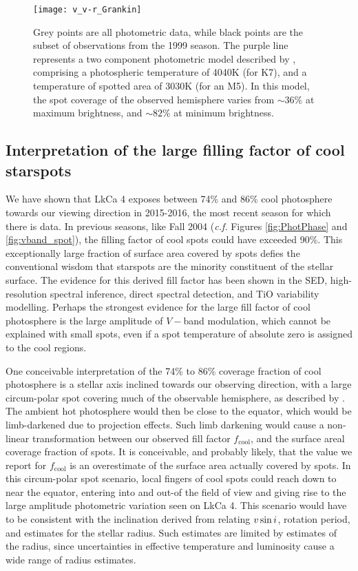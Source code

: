 \documentclass[twocolumn]{emulateapj}%
\begin{document}
\begin{figure}
 \centering
\texttt{[image: v\_v-r\_Grankin]} 
\caption{Grey points are all \citet{grankin08} photometric data, while black points are the subset of observations from the 1999 season.  The purple line represents a two component photometric model  described by \citet{grankin08}, comprising a photospheric temperature of 4040K (for K7), and a temperature of spotted area of 3030K (for an M5). In this model, the spot coverage of the observed hemisphere varies from $\sim36\%$ at maximum brightness, and $\sim82\%$ at minimum brightness.}
 \label{fig:grankin_vr}
\end{figure}




\subsection{Interpretation of the large filling factor of cool starspots}
We have shown that LkCa 4 exposes between 74\% and 86\% cool photosphere towards our viewing direction in 2015-2016, the most recent season for which there is data.  In previous seasons, like Fall 2004 (\emph{c.f.} Figures \ref{fig:PhotPhase} and \ref{fig:vband_spot}), the filling factor of cool spots could have exceeded 90\%.  This exceptionally large fraction of surface area covered by spots defies the conventional wisdom that starspots are the minority constituent of the stellar surface.  The evidence for this derived fill factor has been shown in the SED, high-resolution spectral inference, direct spectral detection, and TiO variability modelling.  Perhaps the strongest evidence for the large fill factor of cool photosphere is the large amplitude of $V-$band modulation, which cannot be explained with small spots, even if a spot temperature of absolute zero is assigned to the cool regions.

One conceivable interpretation of the 74\% to 86\% coverage fraction of cool photosphere is a stellar axis inclined towards our observing direction, with a large circum-polar spot covering much of the observable hemisphere, as described by \citet{donati14}.  The ambient hot photosphere would then be close to the equator, which would be limb-darkened due to projection effects.  Such limb darkening would cause a non-linear transformation between our observed fill factor $f_{\mathrm{cool}}$, and the surface areal coverage fraction of spots.  It is conceivable, and probably likely, that the value we report for $f_{\mathrm{cool}}$ is an overestimate of the surface area actually covered by spots.  In this circum-polar spot scenario, local fingers of cool spots could reach down to near the equator, entering into and out-of the field of view and giving rise to the large amplitude photometric variation seen on LkCa 4.  This scenario would have to be consistent with the inclination derived from relating $v \sin i$, rotation period, and estimates for the stellar radius.  Such estimates are limited by estimates of the radius, since uncertainties in effective temperature and luminosity cause a wide range of radius estimates.
\end{document}
